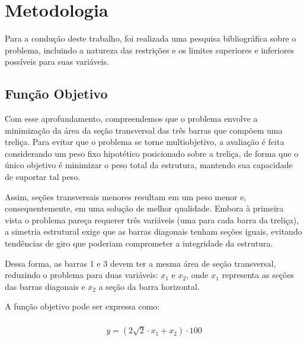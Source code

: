 \section{Metodologia}%
\label{sec:metodologia}

Para a condução deste trabalho, foi realizada uma pesquisa bibliográfica sobre o problema, incluindo a natureza das restrições e os limites superiores e inferiores possíveis para suas variáveis.

\subsection{Função Objetivo}

Com esse aprofundamento, compreendemos que o problema envolve a minimização da área da seção transversal das três barras que compõem uma treliça. Para evitar que o problema se torne multiobjetivo, a avaliação é feita considerando um peso fixo hipotético posicionado sobre a treliça, de forma que o único objetivo é minimizar o peso total da estrutura, mantendo sua capacidade de suportar tal peso.

Assim, seções transversais menores resultam em um peso menor e, consequentemente, em uma solução de melhor qualidade. Embora à primeira vista o problema pareça requerer três variáveis (uma para cada barra da treliça), a simetria estrutural exige que as barras diagonais tenham seções iguais, evitando tendências de giro que poderiam comprometer a integridade da estrutura. 

Dessa forma, as barras 1 e 3 devem ter a mesma área de seção transversal, reduzindo o problema para duas variáveis: \(x_1\) e \(x_2\), onde \(x_1\) representa as seções das barras diagonais e \(x_2\) a seção da barra horizontal.



A função objetivo pode ser expressa como:

\begin{gather}
    \begin{align}
      \begin{split}
        y = \left( 2 \sqrt{2} \cdot x_1 + x_2 \right) \cdot 100
      \end{split}
    \end{align}
\end{gather}

